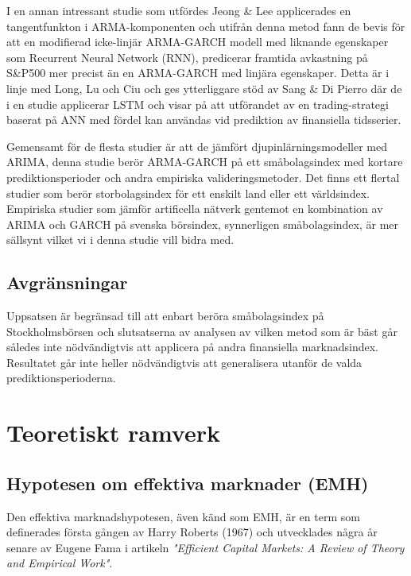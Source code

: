 \documentclass[11pt]{article}
\begin{document}
I en annan intressant studie som utfördes Jeong \& Lee \parencite*{jeong2019recurrent} applicerades en tangentfunkton i ARMA-komponenten och utifrån denna metod fann de bevis för att en modifierad icke-linjär ARMA-GARCH modell med liknande egenskaper som Recurrent Neural Network (RNN), predicerar framtida avkastning på S\&P500 mer precist än en ARMA-GARCH med linjära egenskaper. Detta är i linje med Long, Lu och Ciu \parencite*{long2019deep} och ges ytterliggare stöd av Sang \& Di Pierro \parencite*{sang2019improving} där de i en studie applicerar LSTM och visar på att utförandet av en trading-strategi baserat på ANN med fördel kan användas vid prediktion av finansiella tidsserier. 

Gemensamt för de flesta studier är att de jämfört djupinlärningsmodeller med ARIMA, denna studie berör ARMA-GARCH på ett småbolagsindex med kortare prediktionsperioder och andra empiriska valideringsmetoder. Det finns ett flertal studier som berör storbolagsindex för ett enskilt land eller ett världsindex. Empiriska studier som jämför artificella nätverk gentemot en kombination av ARIMA och GARCH på svenska börsindex, synnerligen småbolagsindex, är mer sällsynt vilket vi i denna studie vill bidra med. 

 
\subsection{Avgränsningar}
Uppsatsen är begränsad till att enbart beröra småbolagsindex på Stockholmsbörsen och slutsatserna av analysen av vilken metod som är bäst går således inte nödvändigtvis att applicera på andra finansiella marknadsindex. Resultatet går inte heller nödvändigtvis att generalisera utanför de valda prediktionsperioderna.


\section{Teoretiskt ramverk}

\subsection{Hypotesen om effektiva marknader (EMH)}
Den effektiva marknadshypotesen, även känd som EMH, är en term som definerades första gången av Harry Roberts (1967) och utvecklades några år senare av Eugene Fama \parencite*{Fama1970} i artikeln \emph{"Efficient Capital Markets: A Review of Theory and Empirical Work"}. 
\end{document}
